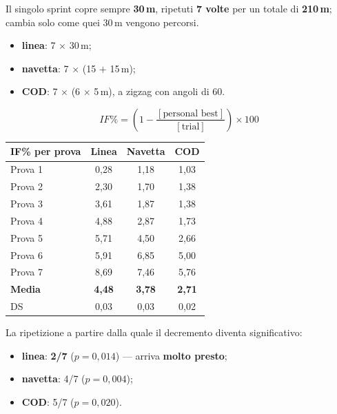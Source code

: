 Il singolo sprint copre sempre \textbf{30\,m}, ripetuti \textbf{7 volte} per un totale di
\textbf{210\,m}; cambia solo come quei 30\,m vengono percorsi.
\begin{itemize}
  \item \textbf{linea}: 7 $\times$ 30\,m;
  \item \textbf{navetta}: 7 $\times$ (15 $+$ 15\,m);
  \item \textbf{COD}: 7 $\times$ (6 $\times$ 5\,m), a zigzag con angoli di 60\textdegree.
\end{itemize}

$$IF\% = \left(1 - \frac{[\text{personal best}]}{[\text{trial}]}\right) \times 100$$

\begin{table}[htbp]
  \centering
  \small
  \renewcommand{\arraystretch}{1.3}
  \begin{tabularx}{\textwidth}{|X|c|c|c|}
    \hline
    \textbf{IF\% per prova} & \textbf{Linea} & \textbf{Navetta} & \textbf{COD} \\
    \hline
    Prova 1 & 0,28 & 1,18 & 1,03 \\
    \hline
    Prova 2 & 2,30 & 1,70 & 1,38 \\
    \hline
    Prova 3 & 3,61 & 1,87 & 1,38 \\
    \hline
    Prova 4 & 4,88 & 2,87 & 1,73 \\
    \hline
    Prova 5 & 5,71 & 4,50 & 2,66 \\
    \hline
    Prova 6 & 5,91 & 6,85 & 5,00 \\
    \hline
    Prova 7 & 8,69 & 7,46 & 5,76 \\
    \hline
    \textbf{Media} & \textbf{4,48} & \textbf{3,78} & \textbf{2,71} \\
    \hline
    DS & 0,03 & 0,03 & 0,02 \\
    \hline
  \end{tabularx}
\end{table}

La ripetizione a partire dalla quale il decremento diventa significativo:
\begin{itemize}
  \item \textbf{linea}: \textbf{2/7} ($p = 0,014$) --- arriva \textbf{molto presto};
  \item \textbf{navetta}: 4/7 ($p = 0,004$);
  \item \textbf{COD}: 5/7 ($p = 0,020$).
\end{itemize}

